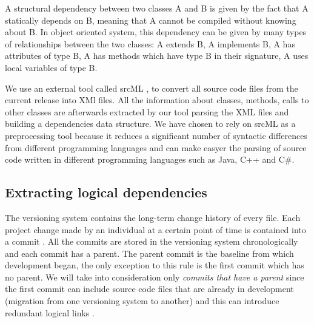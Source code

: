 \documentclass[a4paper,twoside]{article}
\begin{document}
A structural dependency between two classes A and B is given by the fact that A statically depends on B, meaning that A cannot be compiled without knowing about B. In object oriented system, this dependency can be given by many types of relationships between the two classes: A extends B, A implements B, A has attributes of type B, A has methods which have type B in their signature, A uses local variables of type B.


 We use an external tool called srcML \cite{2003:XLC:851042.857028},
\cite{Collard:2011:LTF:2067850.2068011} to convert all source code files from the current release into XMl files. All the information about classes, methods, calls to other classes are afterwards extracted by our tool parsing the XML files and building a dependencies data structure. We have chosen to rely on srcML as a preprocessing tool because it reduces a significant number of syntactic differences from different programming languages and can make easyer the parsing of source code written in different programming languages such as Java, C++ and C\#.    

\subsection{Extracting logical dependencies}

The versioning system contains the long-term change history of every file. Each project change made by an individual at a certain point of time is contained into a commit \cite{svn}. All the commits are stored in the versioning system chronologically and each commit has a parent. The parent commit is the baseline from which development began, the only exception to this rule is the first commit which has no parent. We will take into consideration only \textit{commits that have a parent} since the first commit can include source code files that are already in development (migration from one versioning system to another) and this can introduce redundant logical links \cite{DBLP:journals/jss/AjienkaC17}. 
\end{document}
